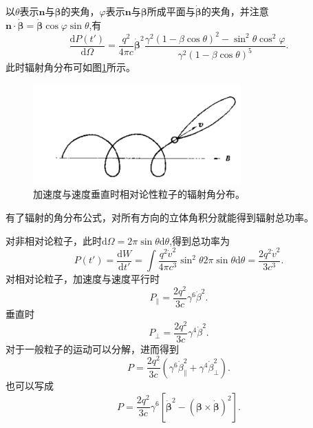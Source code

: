 \documentclass[../天体物理基础.tex]{subfiles}
\begin{document}
以$\theta$表示$\boldsymbol{n}$与$\boldsymbol{\beta}$的夹角，$\varphi$表示$\boldsymbol{n}$与$\boldsymbol{\beta}$所成平面与$\dot{\boldsymbol{\beta}}$的夹角，并注意$\boldsymbol{n}\cdot\dot{\boldsymbol{\beta}}=\dot{\boldsymbol{\beta}}\cos\varphi\sin\theta$,有
\begin{equation}
\frac{\mathrm{d}P\left(t'\right)}{\mathrm{d}\Omega}=\frac{q^{2}}{4\pi c}\dot{\boldsymbol{\beta}}^{2}\frac{\gamma^{2}\left(1-\beta\cos\theta\right)^{2}-\sin^{2}\theta\cos^{2}\varphi}{\gamma^{2}\left(1-\beta\cos\theta\right)^{5}}.
\end{equation}
此时辐射角分布可如图\ref{加速度与速度垂直时相对论性粒子的辐射角分布。}所示。
\begin{figure}[!htbp]
\centering
\includegraphics[width=8cm]{figures/figure1_7.png}
\captionsetup{justification=raggedright, singlelinecheck=false}
\caption{加速度与速度垂直时相对论性粒子的辐射角分布。}
\label{加速度与速度垂直时相对论性粒子的辐射角分布。}
\end{figure}

有了辐射的角分布公式，对所有方向的立体角积分就能得到辐射总功率。

对非相对论粒子，此时$\mathrm{d}\Omega=2\pi\sin\theta\mathrm{d}\theta$,得到总功率为
\begin{equation}
P\left(t'\right)=\frac{\mathrm{d}W}{\mathrm{d}t'}=\int\frac{q^{2}\dot{v}^{2}}{4\pi c^{3}}\sin^{2}\theta2\pi\sin\theta\mathrm{d}\theta=\frac{2q^{2}\dot{v}^{2}}{3c^{3}}.
\end{equation}
对相对论粒子，加速度与速度平行时
\begin{equation}
P_{\parallel}=\frac{2q^{2}}{3c}\gamma^{6}\dot{\beta}^{2}.
\end{equation}
垂直时
\begin{equation}
P_{\bot}=\frac{2q^{2}}{3c}\gamma^{4}\dot{\beta}^{2}.
\end{equation}
对于一般粒子的运动可以分解，进而得到
\begin{equation}
P=\frac{2q^{2}}{3c}\left(\gamma^{6}\dot{\beta}_{\parallel}^{2}+\gamma^{4}\dot{\beta}_{\bot}^{2}\right).
\end{equation}
也可以写成
\begin{equation}
P=\frac{2q^{2}}{3c}\gamma^{6}\left[\dot{\boldsymbol{\beta}}^{2}-\left(\boldsymbol{\beta}\times\dot{\boldsymbol{\beta}}\right)^{2}\right].\label{1.3.59}
\end{equation}
\end{document}
